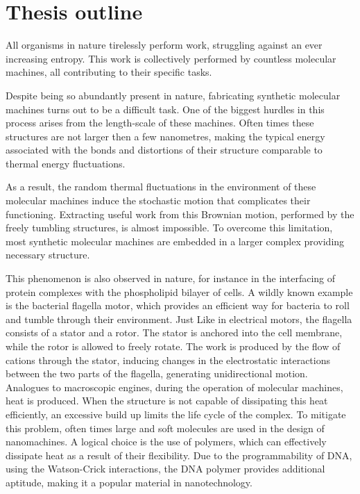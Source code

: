 \section{Thesis outline}

All organisms in nature tirelessly perform work, struggling against an ever increasing
entropy. This work is collectively performed by countless molecular machines, all
contributing to their specific tasks.

Despite being so abundantly present in nature, fabricating synthetic molecular machines
turns out to be a difficult task. One of the biggest hurdles in this process arises from
the length-scale of these machines. Often times these structures are not larger then
a few nanometres, making the typical energy associated with the bonds and
distortions of their structure comparable to thermal energy fluctuations.

As a result, the random thermal fluctuations in the environment of these molecular
machines induce the stochastic motion that complicates their functioning. Extracting
useful work from this Brownian motion, performed by the freely tumbling structures, is
almost impossible. To overcome this limitation, most synthetic molecular machines are
embedded in a larger complex providing necessary structure.

This phenomenon is also observed in nature, for instance in the interfacing of protein
complexes with the phospholipid bilayer of cells.  A wildly known example is the
bacterial flagella motor, which provides an efficient way for bacteria to
roll and tumble through their environment. Just Like in electrical motors, the flagella
consists of a stator and a rotor. The stator is anchored into the cell membrane, while
the rotor is allowed to freely rotate. The work is produced by the flow of cations
through the stator, inducing changes in the electrostatic interactions between the two
parts of the flagella, generating unidirectional motion.\\

Analogues to macroscopic engines, during the operation of molecular machines, heat is
produced. When the structure is not capable of dissipating this heat efficiently, an
excessive build up limits the life cycle of the complex. To mitigate this problem, often
times large and soft molecules are used in the design of nanomachines. A logical choice
is the use of polymers, which can effectively dissipate heat as a result of their
flexibility.  Due to the programmability of DNA, using the Watson-Crick interactions,
the DNA polymer provides additional aptitude, making it a popular material in
nanotechnology.

